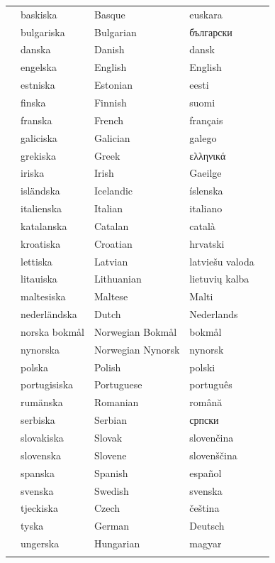 \vspace*{-5mm}
\centering
  \setlength{\tabcolsep}{2em}
  \begin{tabularx}{\textwidth}{lllll} \toprule\addlinespace
  &baskiska & Basque & euskara\\
  &bulgariska & Bulgarian & български\\
  &danska & Danish & dansk\\
  &engelska & English & English\\
  &estniska & Estonian & eesti\\
  &finska & Finnish & suomi\\
  &franska & French & français\\
  &galiciska & Galician & galego\\
  &grekiska & Greek & ελληνικά\\
  &iriska & Irish & Gaeilge\\
  &isländska & Icelandic & íslenska\\
  &italienska & Italian & italiano\\
  &katalanska & Catalan & català\\
  &kroatiska & Croatian & hrvatski\\
  &lettiska & Latvian & latviešu valoda\\
  &litauiska & Lithuanian & lietuvių kalba\\
  &maltesiska & Maltese & Malti\\
  &nederländska & Dutch & Nederlands\\
  &norska bokmål & Norwegian Bokmål & bokmål\\
  &nynorska & Norwegian Nynorsk & nynorsk\\
  &polska & Polish & polski\\
  &portugisiska & Portuguese & português\\
  &rumänska & Romanian & română\\
  &serbiska & Serbian & српски\\
  &slovakiska & Slovak & slovenčina\\
  &slovenska & Slovene & slovenščina\\
  &spanska & Spanish & español\\
  &svenska & Swedish & svenska\\
  &tjeckiska & Czech & čeština\\
  &tyska & German & Deutsch\\
  &ungerska & Hungarian & magyar\\ \addlinespace \bottomrule
\end{tabularx}

